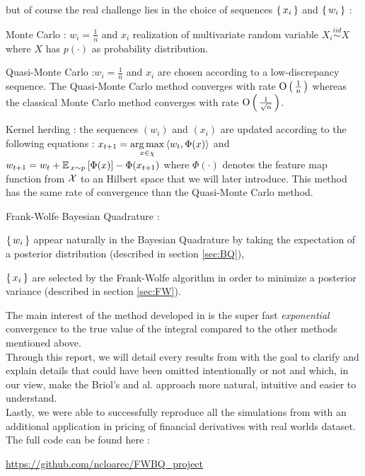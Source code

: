  but of course the real challenge lies in the choice of sequences $\left \{ \, x_i \, \right \}$ and
 $\left \{ \, w_i \, \right \}$ :
  \begin{mydescription}
  \item [Monte Carlo]: $w_i = \frac{1}{n}$ and $x_i$ realization of multivariate random variable $X_i \stackrel{iid}{\sim} X$ where $X$ has $p(\cdot)$ as probability distribution.
  \item [Quasi-Monte Carlo]:$w_i = \frac{1}{n}$ and $x_i$ are chosen according to a low-discrepancy sequence. The Quasi-Monte Carlo method converges with rate $\mathrm{O}\left( \, \frac{1}{ n} \, \right)$ whereas the classical Monte Carlo method converges with rate $\mathrm{O} \left( \, \frac{1}{\sqrt { n }} \, \right)$.
 \item [Kernel herding]: the sequences $(w_i)$ and $(x_i)$ are updated according to the following equations : $x_{t+1} = \underset { x \in \chi}{ \operatorname*{arg\,max} } \left< { w }_{ t },\Phi (x) \right> $ and $w_{t+1} = { w }_{ t }+{ \mathbb{E} \, }_{ x\sim p }\left[ \Phi (x) \right] -\Phi ({ x }_{ t+1 })$ where $\Phi(\cdot)$ denotes the feature map function from $\mathcal{X}$ to an Hilbert space that we will later introduce. This method has the same rate of convergence than the Quasi-Monte Carlo method.
  \item [Frank-Wolfe Bayesian Quadrature]:
  \begin{myitemize}[0.2cm]
\item $\left \{ \, w_i \, \right \}$ appear naturally in the Bayesian Quadrature by taking the expectation of a posterior distribution  (described in section \ref{sec:BQ}),
\item $\left \{ \, x_i \, \right \}$ are selected by the Frank-Wolfe algorithm in order to minimize a posterior variance (described in section \ref{sec:FW}).
\end{myitemize}
  \end{mydescription}
  The main interest of the method developed in \cite{FWBQ} is the super fast
  \textit{exponential} convergence to the true value of the integral compared to the other methods mentioned above.\\

\noindent
  Through this report, we will detail every results from \cite{FWBQ} with the goal
  to clarify and explain details that could have been omitted intentionally or not and which, in our view, make the Briol's and al. approach more natural, intuitive and easier
  to understand.\\

  \noindent
  Lastly, we were able to successfully reproduce all the simulations from \cite{FWBQ} with an additional application in pricing of financial derivatives with real worlds dataset. The full code can be found here :
\begin{center}
  \url{https://github.com/ncloarec/FWBQ_project}
\end{center}


